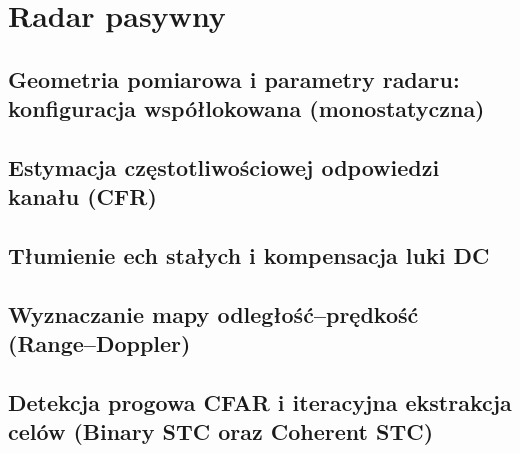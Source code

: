 \section{Radar pasywny}
\label{sec:passive_radar}


\subsection{Geometria pomiarowa i parametry radaru: konfiguracja współlokowana (monostatyczna)}
\label{subsec:pbr_fundamentals}

\subsection{Estymacja częstotliwościowej odpowiedzi kanału (CFR)}
\label{subsec:channel_estimation}

\subsection{Tłumienie ech stałych i kompensacja luki DC}
\label{subsec:clutter_filtering}

\subsection{Wyznaczanie mapy odległość--prędkość (Range--Doppler)}
\label{subsec:range_doppler_map}

\subsection{Detekcja progowa CFAR i iteracyjna ekstrakcja celów (Binary STC oraz Coherent STC)}
\label{subsec:target_detection_extraction}
